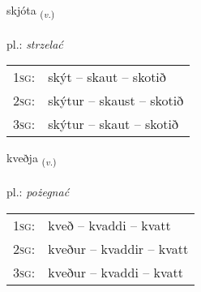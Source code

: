 \documentclass[frontgrid, backgrid]{flacards}\usepackage[]{graphicx}\usepackage[]{xcolor}
\begin{document}
\renewcommand{\blhead}{\vskip5pt {\small\bfseries\footnotesize Sagnorð | czasownik }}
\renewcommand{\bcfoot}{\vskip5pt \hspace{2pt}{\small\bfseries\footnotesize 1K}}


{skjóta \small{\textsubscript{(\textit{v.})}} \\[1ex] %
\textphonetic{[scouːta]} \\
pl.: \emph{strzelać} \\  [2ex]
\renewcommand*{\arraystretch}{0.8}
\begin{tabular}{p{1cm}l}
\textsc{1sg}: & skýt -- skaut -- skotið \\ 
\textsc{2sg}: & skýtur -- skaust -- skotið \\ 
\textsc{3sg}: & skýtur -- skaut -- skotið \\ 
\end{tabular}
}

\renewcommand{\flhead}{\vskip5pt \fboxsep=0pt {\small\bfseries\footnotesize Sagnorð | czasownik}}
\renewcommand{\fcfoot}{\vskip5pt \fboxsep=0pt \hspace{2pt}{\small\bfseries\footnotesize 1K}}

\renewcommand{\blhead}{\vskip5pt {\small\bfseries\footnotesize Sagnorð | czasownik }}
\renewcommand{\bcfoot}{\vskip5pt \hspace{2pt}{\small\bfseries\footnotesize 1K}}


{kveðja \small{\textsubscript{(\textit{v.})}} \\[1ex] %
\textphonetic{[kʰvɛðja]} \\
pl.: \emph{pożegnać} \\  [2ex]
\renewcommand*{\arraystretch}{0.8}
\begin{tabular}{p{1cm}l}
\textsc{1sg}: & kveð -- kvaddi -- kvatt \\ 
\textsc{2sg}: & kveður -- kvaddir -- kvatt \\ 
\textsc{3sg}: & kveður -- kvaddi -- kvatt \\ 
\end{tabular}
}
\end{document}
